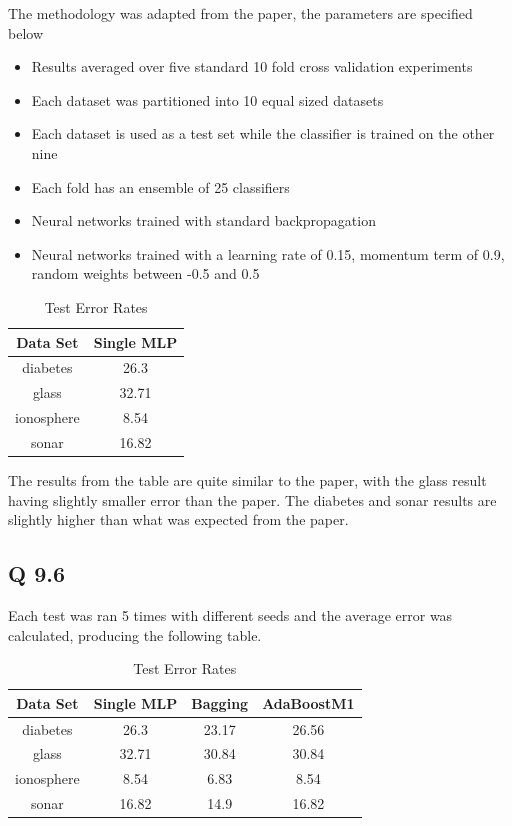 The methodology was adapted from the paper, the parameters are specified below
\begin{itemize}
	\item Results averaged over five standard 10 fold cross validation experiments
	\item Each dataset was partitioned into 10 equal sized datasets
	\item Each dataset is used as a test set while the classifier is trained on the other nine
	\item Each fold has an ensemble of 25 classifiers
	\item Neural networks trained with standard backpropagation
	\item Neural networks trained with a learning rate of 0.15, momentum term of 0.9, random weights between -0.5 and 0.5
\end{itemize}

\begin{table}[H]
\centering
\caption{Test Error Rates}
\begin{tabular}{|c|c|}
\hline
Data Set & Single MLP \\
\hline
diabetes & 26.3 \\
glass & 32.71 \\
ionosphere & 8.54 \\
sonar & 16.82 \\
\hline
\end{tabular}
\end{table}

The results from the table are quite similar to the paper, with the glass result having slightly smaller error than the paper.
The diabetes and sonar results are slightly higher than what was expected from the paper.

\subsection*{Q 9.6}

Each test was ran 5 times with different seeds and the average error was calculated, producing the following table.

\begin{table}[H]
\centering
\caption{Test Error Rates}
\begin{tabular}{|c|c|c|c|}
\hline
Data Set & Single MLP & Bagging & AdaBoostM1 \\
\hline
diabetes & 26.3 & 23.17 & 26.56 \\
glass & 32.71 & 30.84 & 30.84 \\
ionosphere & 8.54 & 6.83 & 8.54 \\
sonar & 16.82 & 14.9 & 16.82 \\
\hline
\end{tabular}
\end{table}

